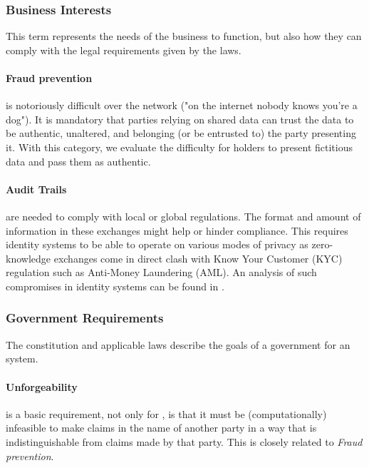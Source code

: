 \subsubsection{Business Interests} 

This term represents the needs of the business to function, but also how they can comply with the legal requirements given by the laws.

\paragraph{Fraud prevention} is notoriously difficult over the network ("on the internet nobody knows you're a dog"). 
It is mandatory that parties relying on shared data can trust the data to be authentic, unaltered, and belonging (or be entrusted to) the party presenting it. With this category, we evaluate the difficulty for holders to present fictitious data and pass them as authentic.

\paragraph{Audit Trails} are needed to comply with local or global regulations.
The format and amount of information in these exchanges might help or hinder compliance.
This requires identity systems to be able to operate on various modes of privacy as zero-knowledge exchanges come in direct clash with Know Your Customer (KYC) regulation such as Anti-Money Laundering (AML). An analysis of such compromises in identity systems can be found in \cite{ABCD25}.

\subsubsection{Government Requirements} 

The constitution and applicable laws describe the goals of a government for an \eid system.

\paragraph{Unforgeability} is a basic requirement, not only for \eid, is that it must be (computationally) infeasible to make claims in the name of another party in a way that is indistinguishable from claims made by that party. This is closely related to \emph{Fraud prevention}.

